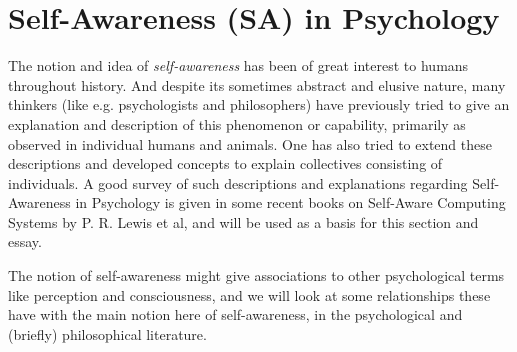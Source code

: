 \documentclass{article}
\begin{document}












\section{Self-Awareness (SA) in Psychology}

The notion and idea of \textit{self-awareness} has been of great interest to humans throughout history. And despite its sometimes abstract and elusive nature, many thinkers (like e.g. psychologists and philosophers) have previously tried to give an explanation and description of this phenomenon or capability, primarily as observed in individual humans and animals. One has also tried to extend these descriptions and developed concepts to explain collectives consisting of individuals. A good survey of such descriptions and explanations regarding Self-Awareness in Psychology is given in some recent books on Self-Aware Computing Systems \cite{sacs16_ch2, sacs17_ch3} by P. R. Lewis et al, and will be used as a basis for this section and essay.

The notion of self-awareness might give associations to other psychological terms like perception and consciousness, and we will look at some relationships these have with the main notion here of self-awareness, in the psychological and (briefly) philosophical literature.
\newline
\end{document}
